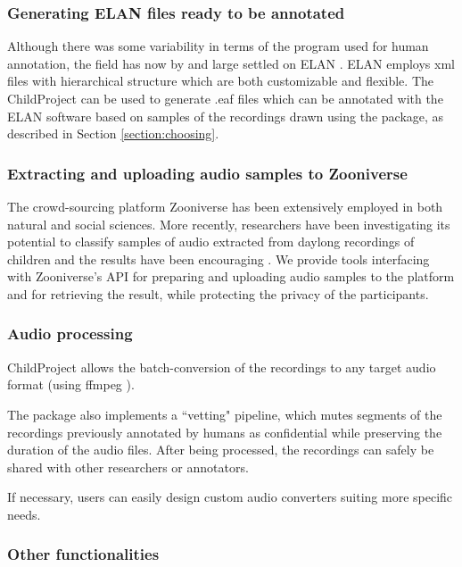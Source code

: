 \documentclass[smallextended]{svjour3}       %
\begin{document}
\subsubsection*{Generating ELAN files ready to be annotated}

Although there was some variability in terms of the program used for human annotation, the field has now by and large settled on ELAN \citep{wittenburg2006elan}. ELAN employs xml files with hierarchical structure which are both customizable and flexible. The ChildProject can be used to generate .eaf files which can be annotated with the ELAN software based on samples of the recordings drawn using the package, as described in Section \ref{section:choosing}.

\subsubsection*{Extracting and uploading audio samples to Zooniverse}

The crowd-sourcing platform Zooniverse \citep{zooniverse} has been extensively employed in both natural \citep{gravityspy} and social sciences. More recently, researchers have been investigating its potential to classify samples of audio extracted from daylong recordings of children and the results have been encouraging  \citep{semenzin2020a,semenzin2020b}. We provide tools interfacing with Zooniverse's API for preparing and uploading audio samples to the platform and for retrieving the result, while protecting the privacy of the participants.

\subsubsection*{Audio processing}

ChildProject allows the batch-conversion of the recordings to any target audio format (using ffmpeg \citealt{ffmpeg}).

The package also implements a ``vetting" \citep{Cychosz2020} pipeline, which mutes segments of the recordings previously annotated by humans as confidential while preserving the duration of the audio files. After being processed, the recordings can safely be shared with other researchers or annotators.

If necessary, users can easily design custom audio converters suiting more specific needs.

\subsubsection*{Other functionalities}
\end{document}
